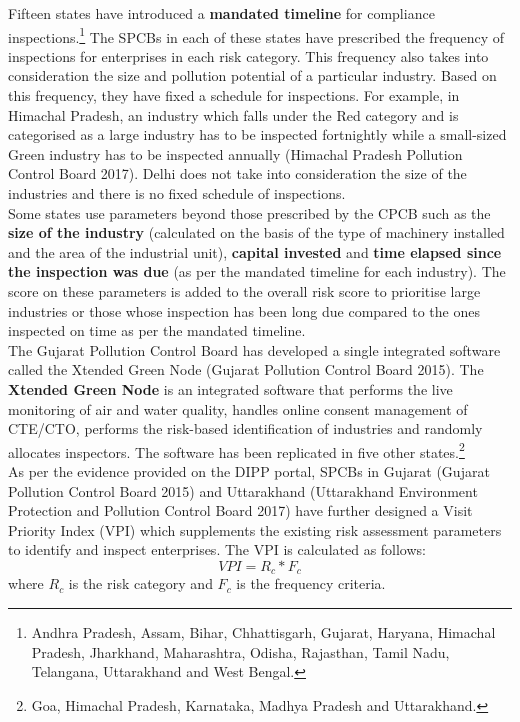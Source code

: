 \documentclass[a4paper, 12pt]{article}
\begin{document}
	Fifteen states have introduced a \textbf{mandated timeline} for compliance inspections.\footnote{Andhra Pradesh, Assam, Bihar, Chhattisgarh, Gujarat, Haryana, Himachal Pradesh, Jharkhand, Maharashtra, Odisha, Rajasthan, Tamil Nadu, Telangana, Uttarakhand and West Bengal.} The SPCBs in each of these states have prescribed the frequency of inspections for enterprises in each risk category. This frequency also takes into consideration the size and pollution potential of a particular industry. Based on this frequency, they have fixed a schedule for inspections. For example, in Himachal Pradesh, an industry which falls under the Red category and is categorised as a large industry has to be inspected fortnightly while a small-sized Green industry has to be inspected annually (Himachal Pradesh Pollution Control Board 2017). Delhi does not take into consideration the size of the industries and there is no fixed schedule of inspections. \\
	
	Some states use parameters beyond those prescribed by the CPCB such as the \textbf{size of the industry} (calculated on the basis of the type of machinery installed and the area of the industrial unit), \textbf{capital invested} and \textbf{time elapsed since the inspection was due} (as per the mandated timeline for each industry). The score on these parameters is added to the overall risk score to prioritise large industries or those whose inspection has been long due compared to the ones inspected on time as per the mandated timeline. \\
	
	The Gujarat Pollution Control Board has developed a single integrated software called the Xtended Green Node (Gujarat Pollution Control Board 2015). The \textbf{Xtended Green Node} is an integrated software that performs the live monitoring of air and water quality, handles online consent management of CTE/CTO, performs the risk-based identification of industries and randomly allocates inspectors. The software has been replicated in five other states.\footnote{Goa, Himachal Pradesh, Karnataka, Madhya Pradesh and Uttarakhand.} \\
	
	As per the evidence provided on the DIPP portal, SPCBs in Gujarat (Gujarat Pollution Control Board 2015) and Uttarakhand (Uttarakhand Environment Protection and Pollution Control Board 2017) have further designed a Visit Priority Index (VPI) which supplements the existing risk assessment parameters to identify and inspect enterprises. The VPI is calculated as follows: $$VPI = R_c *F_c$$ where $R_c$ is the risk category and $F_c$ is the frequency criteria. \\
	
\end{document}
